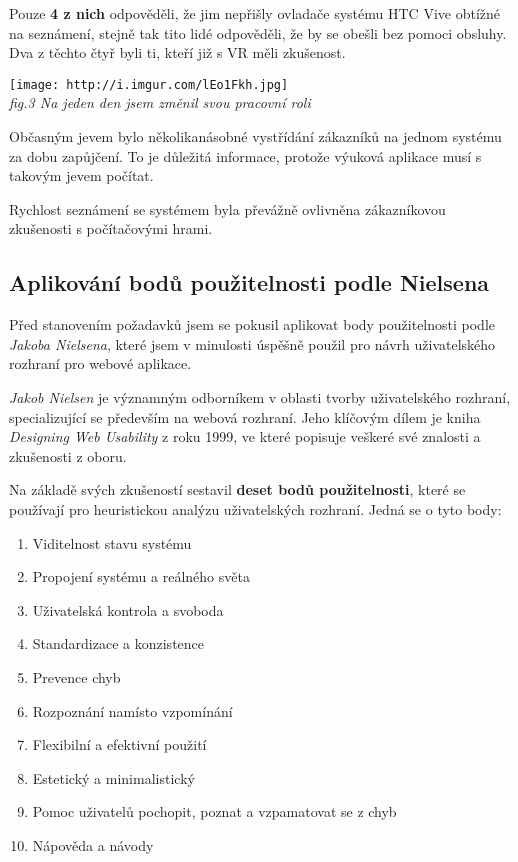 Pouze \textbf{4 z nich} odpověděli, že jim nepřišly ovladače systému HTC
Vive obtížné na seznámení, stejně tak tito lidé odpověděli, že by se
obešli bez pomoci obsluhy. Dva z těchto čtyř byli ti, kteří již s VR
měli zkušenost.

\texttt{[image: http://i.imgur.com/lEo1Fkh.jpg]}\\
\emph{fig.3 Na jeden den jsem změnil svou pracovní roli}

Občasným jevem bylo několikanásobné vystřídání zákazníků na jednom
systému za dobu zapůjčení. To je důležitá informace, protože výuková
aplikace musí s takovým jevem počítat.

Rychlost seznámení se systémem byla převážně ovlivněna zákazníkovou
zkušenosti s počítačovými hrami.

\subsection{Aplikování bodů použitelnosti podle
Nielsena}\label{aplikovuxe1nuxed-bodux16f-pouux17eitelnosti-podle-nielsena}

Před stanovením požadavků jsem se pokusil aplikovat body použitelnosti
podle \emph{Jakoba Nielsena}, které jsem v minulosti úspěšně použil pro
návrh uživatelského rozhraní pro webové aplikace.

\emph{Jakob Nielsen} je významným odborníkem v oblasti tvorby
uživatelského rozhraní, specializující se především na webová rozhraní.
Jeho klíčovým dílem je kniha \emph{Designing Web Usability} z roku 1999,
ve které popisuje veškeré své znalosti a zkušenosti z oboru.

Na základě svých zkušeností sestavil \textbf{deset bodů použitelnosti},
které se používají pro heuristickou analýzu uživatelských rozhraní.
Jedná se o tyto body:

\begin{enumerate}
\def\labelenumi{\arabic{enumi}.}
\tightlist
\item
  Viditelnost stavu systému
\item
  Propojení systému a reálného světa
\item
  Uživatelská kontrola a svoboda
\item
  Standardizace a konzistence
\item
  Prevence chyb
\item
  Rozpoznání namísto vzpomínání
\item
  Flexibilní a efektivní použití
\item
  Estetický a minimalistický
\item
  Pomoc uživatelů pochopit, poznat a vzpamatovat se z chyb
\item
  Nápověda a návody
\end{enumerate}

